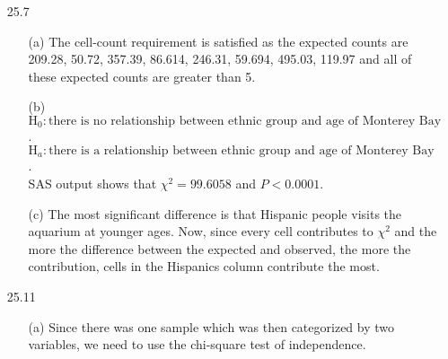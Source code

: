 \documentclass[11pt, a4paper]{article}
\begin{document}
\begin{itemize}
\item[]
\item[]

\item[25.7]
\begin{itemize}
\item[(a)]
The cell-count requirement is satisfied
as the expected counts are 209.28, 50.72, 357.39, 86.614,
246.31, 59.694, 495.03, 119.97 and all of these expected
counts are greater than 5.

\item[]

\item[(b)]
$\text{H}_0: \text{there is no relationship between ethnic group and age
of Monterey Bay Aquarium visitors}$.\\
$\text{H}_a: \text{there is a relationship between ethnic group and age
of Monterey Bay Aquarium visitors}$.\\
SAS output shows that $\chi^2 = 99.6058$ and $P < 0.0001$.

\item[]

\item[(c)]
The most significant difference is that Hispanic people visits
the aquarium at younger ages. Now, since every cell contributes
to $\chi^2$ and the more the difference between the expected and observed, the more the contribution, cells in the Hispanics column contribute the most.
\end{itemize}

\item[]
\item[]

\item[25.11]
\begin{itemize}
\item[(a)]
Since there was one sample which was then categorized by two variables,
we need to use the chi-square test of independence.

\item[]


\end{itemize}
\end{itemize}
\end{document}
